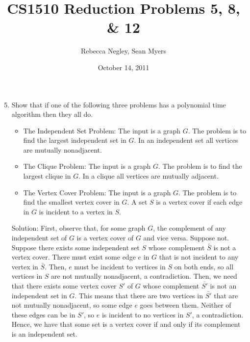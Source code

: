 \documentclass{article}
\title{CS1510  Reduction Problems 5, 8, \& 12}
\author{Rebecca Negley, Sean Myers}
\date{October 14, 2011}
\begin{document}
\maketitle

\begin{enumerate}
\setcounter{enumi}{4}
\item Show that if one of the following three problems has a polynomial time algorithm then they all do.
\begin{itemize}
\item The Independent Set Problem: The input is a graph $G$. The problem is to find the largest independent set in $G$. In an independent set all vertices are mutually nonadjacent.
\item The Clique Problem: The input is a graph $G$. The problem is to find the largest clique in $G$. In a clique all vertices are mutually adjacent.
\item The Vertex Cover Problem: The input is a graph $G$. The problem is to find the smallest vertex cover in $G$. A set $S$ is a vertex cover if each edge in $G$ is incident to a vertex in $S$.
\end{itemize}
Solution: First, observe that, for some graph $G$, the complement of any independent set of $G$ is a vertex cover of $G$ and vice versa. Suppose not. Suppose there exists some independent set $S$ whose complement $\bar{S}$ is not a vertex cover. There must exist some edge $e$ in $G$ that is not incident to any vertex in $\bar{S}$. Then, $e$ must be incident to vertices in $S$ on both ends, so all vertices in $S$ are not mutually nonadjacent, a contradiction. Then, we need that there exists some vertex cover $S'$ of $G$ whose complement $\bar{S'}$ is not an independent set in $G$. This means that there are two vertices in $\bar{S'}$ that are not mutually nonadjacent, so some edge $e$ goes between them. Neither of these edges can be in $S'$, so $e$ is incident to no vertices in $S'$, a contradiction. Hence, we have that some set is a vertex cover if and only if its complement is an independent set.
\newline

\end{enumerate}
\end{document}
